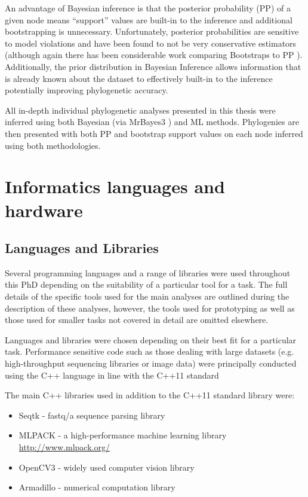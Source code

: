 An advantage of Bayesian inference is that the posterior probability (PP) of a given
node means ``support'' values are built-in to the inference and additional
bootstrapping is unnecessary.  Unfortunately, posterior probabilities are
sensitive to model violations and have been found to not be very conservative estimators
\citep{Simmons2003} (although again there has been considerable work comparing
Bootstraps to PP \citep{Anisimova2006}).
Additionally, the prior distribution in Bayesian Inference allows information
that is already known about the dataset to effectively built-in to the inference
potentially improving phylogenetic accuracy.

All in-depth individual phylogenetic analyses presented in this thesis
were inferred using both Bayesian (via MrBayes3 \citep{Huelsenbeck2001,Ronquist2003a,Ronquist2012})
and ML methods.  Phylogenies are then presented with both PP and bootstrap
support values on each node inferred using both methodologies. 


\section{Informatics languages and hardware}

\subsection{Languages and Libraries} 
Several programming languages and a range of libraries were used throughout this PhD depending
on the suitability of a particular tool for a task.
The full details of the specific tools used for the main analyses are outlined during the description
of these analyses, however, the tools used for prototyping as well as those used for smaller tasks not covered
in detail are omitted elsewhere. 

Languages and libraries were chosen depending on their best fit for a particular task.
Performance sensitive code such as those dealing with large datasets (e.g. high-throughput sequencing 
libraries or image data) were principally conducted using the C++ language 
in line with the C++11 standard \citep{ISOInternationalStandard2011}

The main C++ libraries used in addition to the C++11 standard library were:
\begin{itemize}
    \item Seqtk - fastq/a sequence parsing library \citep{SeqtkGitHub}
    \item MLPACK - a high-performance machine learning library \url{http://www.mlpack.org/} \citep{mlpack2013}
    \item OpenCV3 - widely used computer vision library \citep{opencv_library}
    \item Armadillo - numerical computation library \citep{Sanderson2010}
\end{itemize}

